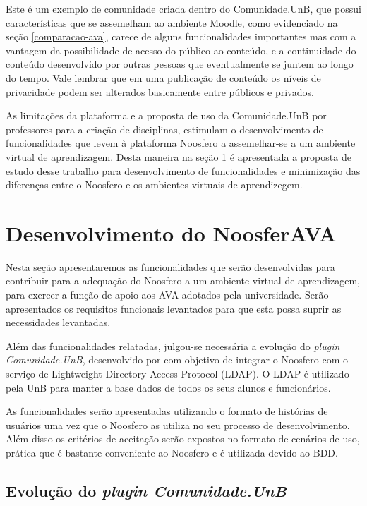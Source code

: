 Este é um exemplo de comunidade criada dentro do Comunidade.UnB, que possui características que se assemelham ao ambiente Moodle, como evidenciado na seção \ref{comparacao-ava}, carece de alguns funcionalidades importantes mas com a vantagem da possibilidade de acesso do público ao conteúdo, e a continuidade do conteúdo desenvolvido por outras pessoas que eventualmente se juntem ao longo do tempo. Vale lembrar que em uma publicação de conteúdo os níveis de privacidade podem ser alterados basicamente entre públicos e privados.

As limitações da plataforma e a proposta de uso da Comunidade.UnB por professores para a criação de disciplinas, estimulam o desenvolvimento de funcionalidades que levem à plataforma Noosfero a assemelhar-se a um ambiente virtual de aprendizagem. Desta maneira na seção \ref{desen-noosferAVA} é apresentada a proposta de estudo desse trabalho para desenvolvimento de funcionalidades e minimização das diferenças entre o Noosfero e os ambientes virtuais de aprendizegem.

\section{Desenvolvimento do NoosferAVA}
\label{desen-noosferAVA}

Nesta seção apresentaremos as funcionalidades que serão desenvolvidas para contribuir para a adequação do Noosfero a um ambiente virtual de aprendizagem, para exercer a função de apoio aos AVA adotados pela universidade. Serão apresentados os requisitos funcionais levantados para que esta possa suprir as necessidades levantadas.

Além das funcionalidades relatadas, julgou-se necessária a evolução do \textit{plugin Comunidade.UnB}, desenvolvido por  com objetivo de integrar o Noosfero com o serviço de Lightweight Directory Access Protocol (LDAP). O LDAP é utilizado pela UnB para manter a base dados de todos os seus alunos e funcionários.

As funcionalidades serão apresentadas utilizando o formato de histórias de usuários uma vez que o Noosfero as utiliza no seu processo de desenvolvimento. Além disso os critérios de aceitação serão expostos no formato de cenários de uso, prática que é bastante conveniente ao Noosfero e é utilizada devido ao BDD.

\subsection{Evolução do \textit{plugin Comunidade.UnB}}

